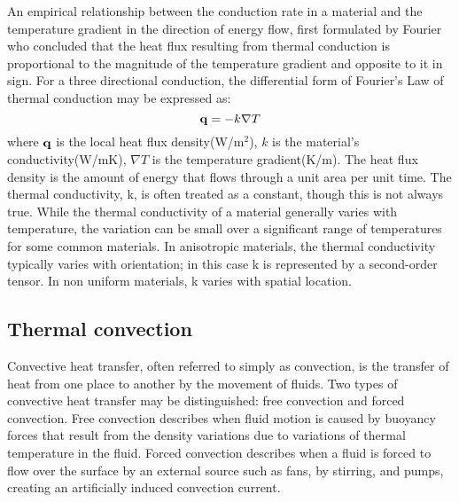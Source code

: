 

An empirical relationship between the conduction rate in a material and the temperature gradient in the direction of energy flow, first formulated by Fourier who concluded that the heat flux resulting from thermal conduction is proportional to the magnitude of the temperature gradient and opposite to it in sign.
For a three directional conduction, the differential form of Fourier's Law of thermal conduction may be expressed as:
\begin{equation}
{\bf{q}} =  - k\nabla T
\end{equation}
where $\bf{q}$ is the local heat flux density(W/m$^2$), $k$ is the material's conductivity(W/mK), $\nabla T$ is the temperature gradient(K/m).
The heat flux density is the amount of energy that flows through a unit area per unit time.
The thermal conductivity, k, is often treated as a constant, though this is not always true.
While the thermal conductivity of a material generally varies with temperature, the variation can be small over a significant range of temperatures for some common materials.
In anisotropic materials, the thermal conductivity typically varies with orientation; in this case k is represented by a second-order tensor. In non uniform materials, k varies with spatial location.

\subsection{Thermal convection}

Convective heat transfer, often referred to simply as convection, is the transfer of heat from one place to another by the movement of fluids.
Two types of convective heat transfer may be distinguished: free convection and forced convection.
Free convection describes when fluid motion is caused by buoyancy forces that result from the density variations due to variations of thermal temperature in the fluid.
Forced convection describes when a fluid is forced to flow over the surface by an external source such as fans, by stirring, and pumps, creating an artificially induced convection current.

